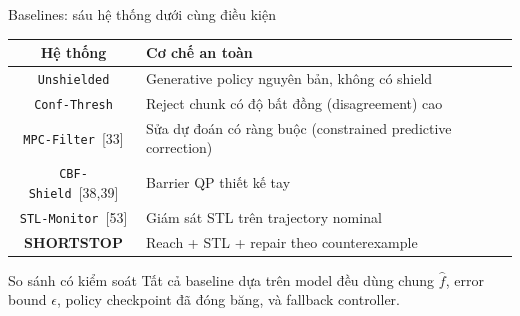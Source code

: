 \documentclass[aspectratio=169]{beamer}
\begin{document}
\begin{frame}[t,shrink=8]{Baselines: sáu hệ thống dưới cùng điều kiện}

\begin{center}

\begin{tabular}{c|l}
\textbf{Hệ thống} & \textbf{Cơ chế an toàn} \\ \hline

\texttt{Unshielded}
& Generative policy nguyên bản, không có shield
\\[3pt]

\texttt{Conf-Thresh}
& Reject chunk có độ bất đồng (disagreement) cao
\\[3pt]

\texttt{MPC-Filter}~[33]
& Sửa dự đoán có ràng buộc (constrained predictive correction)
\\[3pt]

\texttt{CBF-Shield}~[38,39]
& Barrier QP thiết kế tay
\\[3pt]

\texttt{STL-Monitor}~[53]
& Giám sát STL trên trajectory nominal
\\[3pt]

\textbf{SHORTSTOP}
& Reach + STL + repair theo counterexample
\end{tabular}

\end{center}

\vspace{7pt}

\begin{alertblock}{So sánh có kiểm soát}
Tất cả baseline dựa trên model đều dùng chung
$\hat f$, error bound $\epsilon$, policy checkpoint đã đóng băng,
và fallback controller.
\end{alertblock}

\end{frame}
\end{document}
